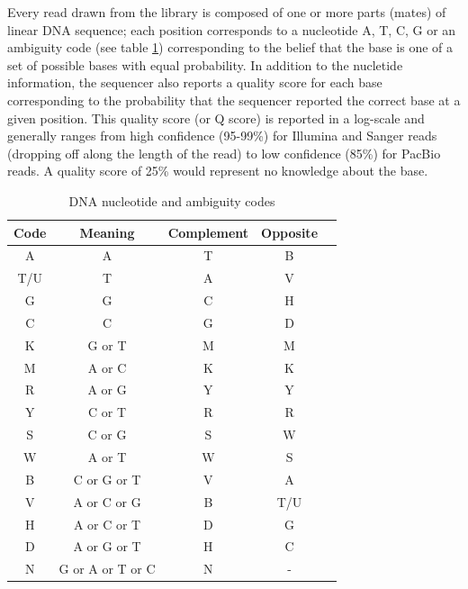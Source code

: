\documentclass[phd,tocprelim]{cornell}
\begin{document}
Every read drawn from the library is composed of one or more parts (mates) of linear DNA sequence; each position corresponds to a nucleotide {\color{red} A}, {\color{blue} T}, {\color{MyDarkGreen} C}, {\color{orange} G} or an ambiguity code (see table \ref{ambcodes}) corresponding to the belief that the base is one of a set of possible bases with equal probability. In addition to the nucletide information, the sequencer also reports a quality score for each base corresponding to the probability that the sequencer reported the correct base at a given position. This quality score (or Q score) is reported in a log-scale and generally ranges from high confidence (95-99\%) for Illumina and Sanger reads (dropping off along the length of the read) to low confidence (85\%) for PacBio reads. A quality score of 25\% would represent no knowledge about the base.

\begin{table}[htp]
\caption{DNA nucleotide and ambiguity codes}
\label{ambcodes}
\begin{center}
    \begin{tabular}{c|c|c|c|c}
        Code & Meaning & Complement & Opposite \\
        \hline
        {\color{red} A} & {\color{red} A} & {\color{blue} T} & B \\
        {\color{blue} T}/U & {\color{blue} T} & {\color{red} A} & V \\
        {\color{orange} G} & {\color{orange} G} & {\color{MyDarkGreen} C} & H \\
        {\color{MyDarkGreen} C} & {\color{MyDarkGreen} C} & {\color{orange} G} & D \\
        K & {\color{orange} G} or {\color{blue} T} & M & M \\
        M & {\color{red} A} or {\color{MyDarkGreen} C} & K & K \\
        R & {\color{red} A} or {\color{orange} G} & Y & Y \\
        Y & {\color{MyDarkGreen} C} or {\color{blue} T} & R & R \\
        S & {\color{MyDarkGreen} C} or {\color{orange} G} & S & W \\
        W & {\color{red} A} or {\color{blue} T} & W & S \\
        B & {\color{MyDarkGreen} C} or {\color{orange} G} or {\color{blue} T} & V & {\color{red} A} \\
        V & {\color{red} A} or {\color{MyDarkGreen} C} or {\color{orange} G} & B & {\color{blue} T}/U \\
        H & {\color{red} A} or {\color{MyDarkGreen} C} or {\color{blue} T} & D & {\color{orange} G} \\
        D & {\color{red} A} or {\color{orange} G} or {\color{blue} T} & H & {\color{MyDarkGreen} C} \\
        N & {\color{orange} G} or {\color{red} A} or {\color{blue} T} or {\color{MyDarkGreen} C} & N & -
    \end{tabular}\
\end{center}
\end{table}
\end{document}
